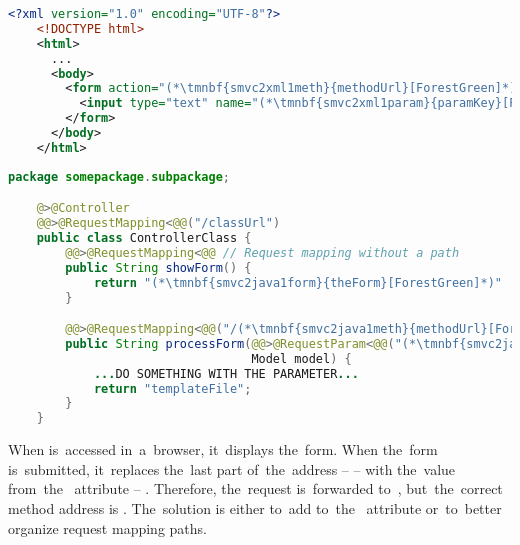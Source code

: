 \begin{lstlisting}[language=XML, title={Simple HTML form \tmnbf{smvc2xml1form}{\textit{theForm}}\textit{.html}}]
    <?xml version="1.0" encoding="UTF-8"?>
    <!DOCTYPE html>
    <html>
      ...
      <body>
        <form action="(*\tmnbf{smvc2xml1meth}{methodUrl}[ForestGreen]*)" method="post">
          <input type="text" name="(*\tmnbf{smvc2xml1param}{paramKey}[ForestGreen]*)">
        </form>
      </body>
    </html>
\end{lstlisting}
\begin{lstlisting}[language=Java, title={Controller class}]
    package somepackage.subpackage;

    @>@Controller
    @@>@RequestMapping<@@("/classUrl")
    public class ControllerClass {
        @@>@RequestMapping<@@ // Request mapping without a path
        public String showForm() {
            return "(*\tmnbf{smvc2java1form}{theForm}[ForestGreen]*)"
        }

        @@>@RequestMapping<@@("/(*\tmnbf{smvc2java1meth}{methodUrl}[ForestGreen]*)")
        public String processForm(@@>@RequestParam<@@("(*\tmnbf{smvc2java1param}{paramKey}[ForestGreen]*)") String singleParameter,
                                  Model model) {
            ...DO SOMETHING WITH THE PARAMETER...
            return "templateFile";
        }
    }
\end{lstlisting}

\noindent When  is~accessed in~a~browser, it~displays the~form.
When the~form is~submitted, it~replaces the~last part of~the~address --  -- with the~value from~the~ attribute -- .
Therefore, the~request is~forwarded to~, but~the~correct method address is .
The~solution is either to~add  to~the~ attribute or~to~better organize request mapping paths.
